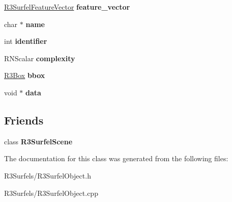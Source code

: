 \begin{DoxyCompactItemize}
\item 
\hyperlink{class_r3_surfel_feature_vector}{R3\+Surfel\+Feature\+Vector} {\bfseries feature\+\_\+vector}\hypertarget{class_r3_surfel_object_af288dd7af7614eb26ba3570290ee9342}{}\label{class_r3_surfel_object_af288dd7af7614eb26ba3570290ee9342}

\item 
char $\ast$ {\bfseries name}\hypertarget{class_r3_surfel_object_af5f9566ffc2519a38afcbd390ff45a89}{}\label{class_r3_surfel_object_af5f9566ffc2519a38afcbd390ff45a89}

\item 
int {\bfseries identifier}\hypertarget{class_r3_surfel_object_a3ad735a3f4a9d8b6a222821915c11392}{}\label{class_r3_surfel_object_a3ad735a3f4a9d8b6a222821915c11392}

\item 
R\+N\+Scalar {\bfseries complexity}\hypertarget{class_r3_surfel_object_a953c79b28b143eec4f0b8f5e22431c93}{}\label{class_r3_surfel_object_a953c79b28b143eec4f0b8f5e22431c93}

\item 
\hyperlink{class_r3_box}{R3\+Box} {\bfseries bbox}\hypertarget{class_r3_surfel_object_aed0e5f4987004e25c81492989b5fb3c9}{}\label{class_r3_surfel_object_aed0e5f4987004e25c81492989b5fb3c9}

\item 
void $\ast$ {\bfseries data}\hypertarget{class_r3_surfel_object_a8708ea5683dbb7430a70421e047df9fd}{}\label{class_r3_surfel_object_a8708ea5683dbb7430a70421e047df9fd}

\end{DoxyCompactItemize}
\subsection*{Friends}
\begin{DoxyCompactItemize}
\item 
class {\bfseries R3\+Surfel\+Scene}\hypertarget{class_r3_surfel_object_af9bb32c0eac7d1d54787bbc6b44586b6}{}\label{class_r3_surfel_object_af9bb32c0eac7d1d54787bbc6b44586b6}

\end{DoxyCompactItemize}


The documentation for this class was generated from the following files\+:\begin{DoxyCompactItemize}
\item 
R3\+Surfels/R3\+Surfel\+Object.\+h\item 
R3\+Surfels/R3\+Surfel\+Object.\+cpp\end{DoxyCompactItemize}

